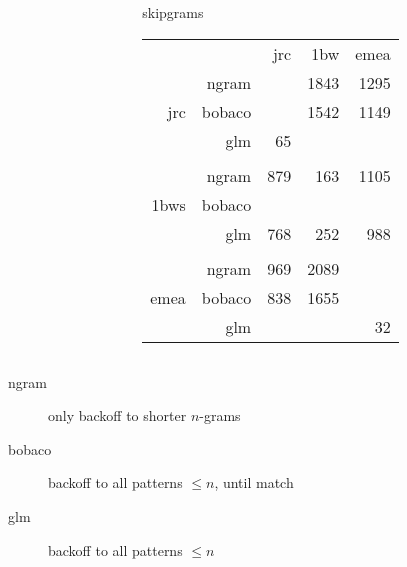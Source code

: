 \begin{frame}
\begin{columns}[T]
\begin{column}{.5\textwidth}
\end{column}%
\hfill%
\begin{column}{.5\textwidth}
    \begin{block}{skipgrams}
    {\small
        \begin{tabular}{rrrrr}
                                  &       & jrc & 1bw  & emea \\ \cline{3-5}
            \multirow{3}{*}{jrc}  & ngram & \cellcolor{green!25}{13}  & 1843 & 1295 \\
                                  & bobaco& \cellcolor{green!25}{13}  & 1542 & 1149 \\
                                  & glm   & 65  & \cellcolor{green!25}{1195} & \cellcolor{green!25}{939}  \\
 &&&& \\
            \multirow{3}{*}{1bws} & ngram & 879 & 163  & 1105 \\
                                  & bobaco& \cellcolor{green!25}{751} & \cellcolor{green!25}{162}  & \cellcolor{green!25}{921}  \\
                                  & glm   & 768 & 252  & 988  \\ 
 &&&& \\
            \multirow{3}{*}{emea} & ngram & 969 & 2089 & \cellcolor{green!25}{4}    \\   
                                  & bobaco& 838 & 1655 & \cellcolor{green!25}{4}    \\
                                  & glm   & \cellcolor{green!25}{581} & \cellcolor{green!25}{1155} & 32
        \end{tabular}
    }
    \end{block}
\end{column}%
\end{columns}

\begin{description}
    \item[ngram] only backoff to shorter $n$-grams
    \item[bobaco] backoff to all patterns $\leq n$, until match
    \item[glm] backoff to all patterns $\leq n$
\end{description}


\end{frame}

